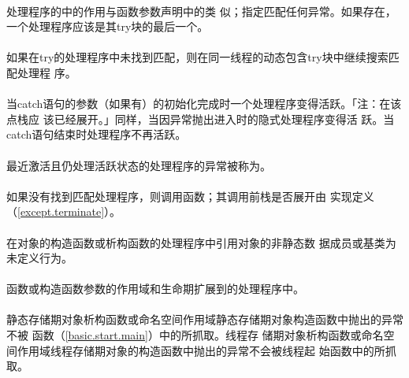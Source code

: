 \paragraph{}
处理程序的中的作用与函数参数声明中的类
似；指定匹配任何异常。如果存在，一个处理程序应该是其try块的最后一个。

\paragraph{}
如果在try的处理程序中未找到匹配，则在同一线程的动态包含try块中继续搜索匹配处理程
序。

\paragraph{}
当catch语句的参数（如果有）的初始化完成时一个处理程序变得活跃。「注：在该点栈应
该已经展开。」同样，当因异常抛出进入时的隐式处理程序变得活
跃。当catch语句结束时处理程序不再活跃。

\paragraph{}
最近激活且仍处理活跃状态的处理程序的异常被称为。

\paragraph{}
如果没有找到匹配处理程序，则调用函数；其调用前栈是否展开由
实现定义（\ref{except.terminate}）。

\paragraph{}
在对象的构造函数或析构函数的处理程序中引用对象的非静态数
据成员或基类为未定义行为。

\paragraph{}
函数或构造函数参数的作用域和生命期扩展到的处理程序中。

\paragraph{}
静态存储期对象析构函数或命名空间作用域静态存储期对象构造函数中抛出的异常不被
函数（\ref{basic.start.main}）中的所抓取。线程存
储期对象析构函数或命名空间作用域线程存储期对象的构造函数中抛出的异常不会被线程起
始函数中的所抓取。

